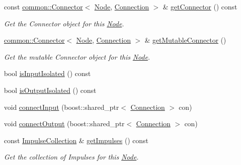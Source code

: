 \begin{DoxyCompactItemize}
const \hyperlink{classcryomesh_1_1common_1_1Connector}{common\-::\-Connector}$<$ \hyperlink{classcryomesh_1_1components_1_1Node}{\-Node}, \*
\hyperlink{classcryomesh_1_1components_1_1Connection}{\-Connection} $>$ \& \hyperlink{classcryomesh_1_1components_1_1Node_a28367d5dc76da04958ca22f6384f6073}{get\-Connector} () const 
\begin{DoxyCompactList}\small\item\em \-Get the \-Connector object for this \hyperlink{classcryomesh_1_1components_1_1Node}{\-Node}. \end{DoxyCompactList}\item 
\hyperlink{classcryomesh_1_1common_1_1Connector}{common\-::\-Connector}$<$ \hyperlink{classcryomesh_1_1components_1_1Node}{\-Node}, \*
\hyperlink{classcryomesh_1_1components_1_1Connection}{\-Connection} $>$ \& \hyperlink{classcryomesh_1_1components_1_1Node_ae28261bb67b7412a67b21a4e4adaa9b1}{get\-Mutable\-Connector} ()
\begin{DoxyCompactList}\small\item\em \-Get the mutable \-Connector object for this \hyperlink{classcryomesh_1_1components_1_1Node}{\-Node}. \end{DoxyCompactList}\item 
bool \hyperlink{classcryomesh_1_1components_1_1Node_a501c4e986a566a4e7fc5f9c87e9c4d8e}{is\-Input\-Isolated} () const 
\item 
bool \hyperlink{classcryomesh_1_1components_1_1Node_a211678e84d71cb71e3721eb9725fa934}{is\-Output\-Isolated} () const 
\item 
void \hyperlink{classcryomesh_1_1components_1_1Node_a4a7775d987020170538f059688ff4a1f}{connect\-Input} (boost\-::shared\-\_\-ptr$<$ \hyperlink{classcryomesh_1_1components_1_1Connection}{\-Connection} $>$ con)
\item 
void \hyperlink{classcryomesh_1_1components_1_1Node_a660adcc4e2b3b7a427ad4625e5279de4}{connect\-Output} (boost\-::shared\-\_\-ptr$<$ \hyperlink{classcryomesh_1_1components_1_1Connection}{\-Connection} $>$ con)
\item 
const \hyperlink{classcryomesh_1_1components_1_1ImpulseCollection}{\-Impulse\-Collection} \& \hyperlink{classcryomesh_1_1components_1_1Node_a63316f8a1ad0ffe3ee22f8b455ef27a4}{get\-Impulses} () const 
\begin{DoxyCompactList}\small\item\em \-Get the collection of \-Impulses for this \hyperlink{classcryomesh_1_1components_1_1Node}{\-Node}. \end{DoxyCompactList}\item 

\end{DoxyCompactItemize}
